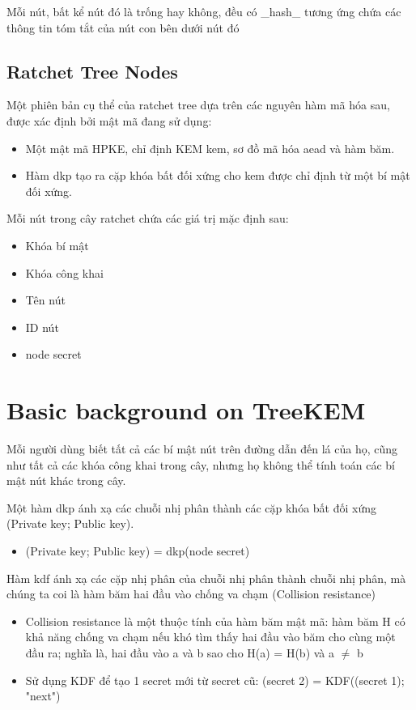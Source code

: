 \documentclass[../main-report.tex]{subfiles}
\begin{document}
Mỗi nút, bất kể nút đó là trống hay không, đều có \_hash\_ tương ứng chứa các thông tin tóm tắt của nút con bên dưới nút đó


\subsection{Ratchet Tree Nodes}
Một phiên bản cụ thể của ratchet tree dựa trên các nguyên hàm mã hóa sau, được xác định bởi mật mã đang sử dụng:

\begin{itemize}
\item{Một mật mã HPKE, chỉ định \glsdesc{KEM} \acrfull{kem}, sơ đồ mã hóa \acrshort{aead} và hàm băm.}
\item{Hàm \acrfull{dkp} tạo ra cặp khóa bất đối xứng cho \acrshort{kem} được chỉ định từ một bí mật đối xứng.}
\end{itemize} 

Mỗi nút trong cây ratchet chứa các giá trị mặc định sau:

\begin{itemize}
\item{Khóa bí mật}
\item{Khóa công khai}
\item{Tên nút}
\item{ID nút}
\item{node secret}
\end{itemize}

\section{Basic background on TreeKEM}
Mỗi người dùng biết tất cả các bí mật nút trên đường dẫn đến lá của họ, cũng như tất cả các khóa công khai trong cây, nhưng họ không thể tính toán các bí mật nút khác trong cây.

Một hàm \acrfull{dkp} ánh xạ các chuỗi nhị phân thành các cặp khóa bất đối xứng (\gls{Private key}; \gls{Public key}).

\begin{itemize}
\item{(\gls{Private key}; \gls{Public key}) = \acrshort{dkp}(node secret)}
\end{itemize}

Hàm \acrfull{kdf} ánh xạ các cặp nhị phân của chuỗi nhị phân thành chuỗi nhị phân, mà chúng ta coi là hàm băm hai đầu vào chống va chạm (Collision resistance)

\begin{itemize}
\item{Collision resistance là một thuộc tính của hàm băm mật mã: hàm băm H có khả năng chống va chạm nếu khó tìm thấy hai đầu vào băm cho cùng một đầu ra; nghĩa là, hai đầu vào a và b sao cho H(a) = H(b) và a $\neq$ b}
\item{Sử dụng KDF để tạo 1 secret mới từ secret cũ: (secret 2) = KDF((secret 1); "next")}
\end{itemize}
\end{document}
